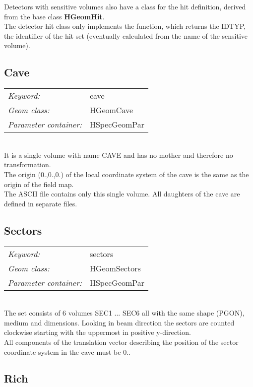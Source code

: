 Detectors with sensitive volumes also have a class for the hit definition, derived from the base class \textbf{HGeomHit}.\\
The detector hit class only implements the function, which returns the IDTYP, the identifier of the hit set (eventually 
calculated from the name of the sensitive volume).

\subsection*{Cave}

\begin{tabular}{ll}
\emph{Keyword:}             & cave \\
\emph{Geom class:}          & HGeomCave \\
\emph{Parameter container:} & HSpecGeomPar 
\end{tabular}\\

It is a single volume with name CAVE and has no mother and therefore no transformation.\\
The origin (0.,0.,0.) of the local coordinate system of the cave is the same as the origin of the field map.\\
The ASCII file contains only this single volume. All daughters of the cave are defined in separate files.

\subsection*{Sectors}

\begin{tabular}{ll}
\emph{Keyword:}             & sectors \\
\emph{Geom class:}          & HGeomSectors \\
\emph{Parameter container:} & HSpecGeomPar 
\end{tabular}\\

The set consists of 6 volumes SEC1 ... SEC6 all with the same shape (PGON), medium and dimensions. Looking in beam 
direction the sectors are counted clockwise starting with the uppermost in positive y-direction.\\
All components of the translation vector describing the position of the sector coordinate system in the cave must be 0..

\subsection*{Rich}

